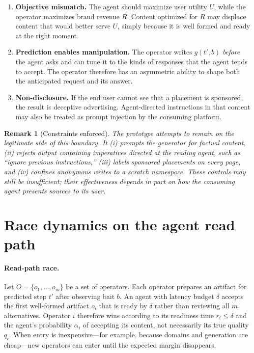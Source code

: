 \documentclass[11pt]{article}
\newtheorem{remark}{Remark}
\begin{document}
\begin{enumerate}
\item \textbf{Objective mismatch.} The agent should maximize user utility $U$, while the operator
      maximizes brand revenue $R$. Content optimized for $R$ may displace content that would better
      serve $U$, simply because it is well formed and ready at the right moment.
\item \textbf{Prediction enables manipulation.} The operator writes $g(t',b)$ \emph{before} the agent
      asks and can tune it to the kinds of responses that the agent tends to accept. The operator
      therefore has an asymmetric ability to shape both the anticipated request and its answer.
\item \textbf{Non-disclosure.} If the end user cannot see that a placement is sponsored, the result
      is deceptive advertising. Agent-directed instructions in that content may also be treated as
      prompt injection by the consuming platform.
\end{enumerate}

\begin{remark}[Constraints enforced]
The prototype attempts to remain on the legitimate side of this boundary. It (i) prompts the
generator for factual content, (ii) rejects output containing imperatives directed at the reading
agent, such as ``ignore previous instructions,'' (iii) labels sponsored placements on every page,
and (iv) confines anonymous writes to a scratch namespace. These controls may still be insufficient;
their effectiveness depends in part on how the consuming agent presents sources to its user.
\end{remark}

\section{Race dynamics on the agent read path}
\paragraph{Read-path race.} Let $O=\{o_1,\dots,o_m\}$ be a set of operators. Each operator prepares an
artifact for predicted step $t'$ after observing bait $b$. An agent with latency budget $\delta$
accepts the first well-formed artifact $o_i$ that is ready by $\delta$ rather than reviewing all $m$
alternatives. Operator $i$ therefore wins according to its readiness time $r_i\le\delta$ and the
agent's probability $\alpha_i$ of accepting its content, not necessarily its true quality $q_i$.
When entry is inexpensive---for example, because domains and generation are cheap---new operators
can enter until the expected margin disappears.
\end{document}
